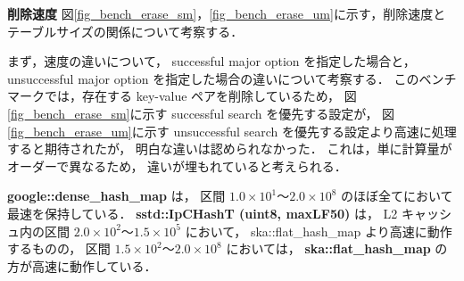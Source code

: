 %
{\bf 削除速度}
\samepage\newline\indent
図\ref{fig_bench_erase_sm}，\ref{fig_bench_erase_um}に示す，削除速度とテーブルサイズの関係について考察する．

まず，速度の違いについて，
successful major option を指定した場合と，
unsuccessful major option を指定した場合の違いについて考察する．
このベンチマークでは，存在する key-value ペアを削除しているため，
図\ref{fig_bench_erase_sm}に示す successful search を優先する設定が，
図\ref{fig_bench_erase_um}に示す unsuccessful search を優先する設定より高速に処理すると期待されたが，
明白な違いは認められなかった．
これは，単に計算量がオーダーで異なるため，
違いが埋もれていると考えられる．

{\bf google::dense\_hash\_map} は，
区間 $1.0\times10^1〜2.0\times10^8$ のほぼ全てにおいて最速を保持している．
{\bf sstd::IpCHashT (uint8, maxLF50)} は，
L2 キャッシュ内の区間 $2.0\times10^2〜1.5\times10^5$ において，
ska::flat\_hash\_map より高速に動作するものの，
区間 $1.5\times10^2〜2.0\times10^8$ においては，
{\bf ska::flat\_hash\_map} の方が高速に動作している．



